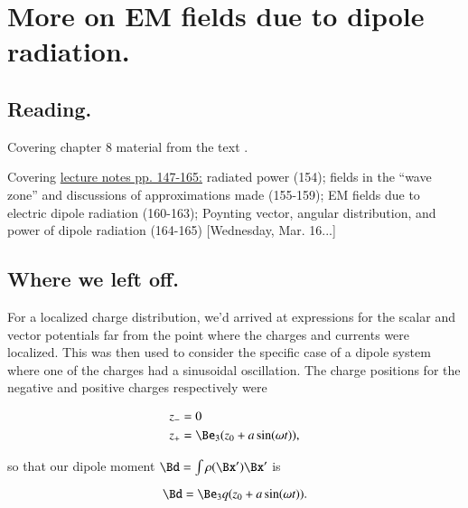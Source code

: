 %
%

\chapter{More on EM fields due to dipole radiation.}
\label{chap:relativisticElectrodynamicsL21}
{}
\date{Mar 22, 2011}

\beginArtNoToc

\section{Reading.}

Covering chapter 8 material from the text \cite{landau1980classical}.

Covering \href{http://www.physics.utoronto.ca/~poppitz/epoppitz/PHY450_files/RelEMpp147-165.pdf}{lecture notes pp. 147-165:} radiated power (154); fields in the ``wave zone'' and discussions of approximations made (155-159); EM fields due to electric dipole radiation (160-163); Poynting vector, angular distribution, and power of dipole radiation (164-165) [Wednesday, Mar. 16...]

\section{Where we left off.}

For a localized charge distribution, we'd arrived at expressions for the scalar and vector potentials far from the point where the charges and currents were localized.  This was then used to consider the specific case of a dipole system where one of the charges had a sinusoidal oscillation.  The charge positions for the negative and positive charges respectively were

\begin{align}\label{eqn:relativisticElectrodynamicsL21:10}
z_{-} &= 0 \\
z_{+} &= \Be_3( z_0 + a \sin(\omega t)) ,
\end{align}

so that our dipole moment $\Bd = \int \rho(\Bx') \Bx'$ is

\begin{equation}\label{eqn:relativisticElectrodynamicsL21:30}
\Bd = \Be_3 q (z_0 + a \sin(\omega t)).
\end{equation}

